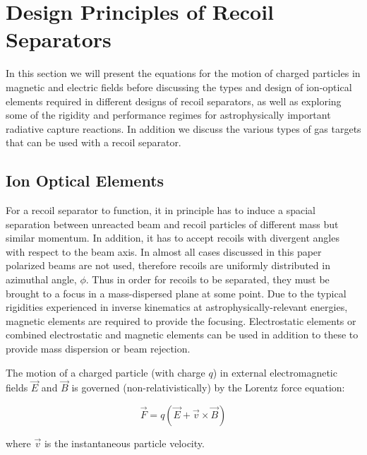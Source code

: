 \section{Design Principles of Recoil Separators}
\label{emsep}

In this section we will present the equations for the motion of charged particles in magnetic and electric fields before discussing the types and design of ion-optical elements required in different designs of recoil separators, as well as exploring some of the rigidity and performance regimes for astrophysically important radiative capture reactions. In addition we discuss the various types of gas targets that can be used with a recoil separator.

\subsection{Ion Optical Elements}

For a recoil separator to function, it in principle has to induce a spacial separation between unreacted beam and recoil particles of different mass but similar momentum. In addition, it has to accept recoils with divergent angles with respect to the beam axis. In almost all cases discussed in this paper polarized beams are not used, therefore recoils are uniformly distributed in azimuthal angle, $\phi$. 
Thus in order for recoils to be separated, they must be brought to a focus in a mass-dispersed plane at some point. Due to the typical rigidities experienced in inverse kinematics at astrophysically-relevant energies, magnetic elements are required to provide the focusing. Electrostatic elements or combined electrostatic and magnetic elements can be used in addition to these to provide mass dispersion or beam rejection.  

The motion of a charged particle (with charge $q$) in external electromagnetic fields $\vec{E}$ and $\vec{B}$  is governed (non-relativistically) by the Lorentz force equation:

\begin{equation}
\vec{F}=q(\vec{E}+\vec{v}\times\vec{B})
\end{equation}   

where $\vec{v}$ is the instantaneous particle velocity. 




